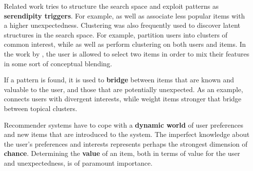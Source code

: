 Related work tries to structure the search space and exploit patterns as \textbf{serendipity triggers}.  For example, \cite{Herlocker2004} as well as \cite{Lu2012} associate less popular items with a higher unexpectedness. Clustering was also frequently used to discover latent structures in the search space. For example, \cite{Kamahara2005} partition users into clusters of common interest, while \cite{Onuma2009} as well as \cite{Zhang2011} perform clustering on both users and items. In the work by \cite{Oku2011}, the user is allowed to select two items in order to mix their features in some sort of conceptual blending. 

If a pattern is found, it is used to \textbf{bridge} between items that are known and valuable to the user, and those that are potentially unexpected.  As an example,  \cite{Sugiyama2011} connects users with divergent interests, while \cite{Onuma2009} weight items stronger that bridge between topical clusters. 

Recommender systems have to cope with a \textbf{dynamic world} of user preferences and new items that are introduced to the system. The imperfect knowledge about the user's preferences and interests represents perhaps the strongest dimension of \textbf{chance}.  Determining the \textbf{value} of an item, both in terms of value for the user and unexpectedness, is of paramount importance.  
